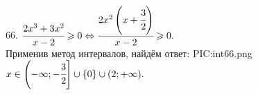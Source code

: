 66. $\cfrac{2x^3+3x^2}{x-2}\geqslant0\Leftrightarrow\cfrac{2x^2\left(x+\cfrac{3}{2}\right)}{x-2}\geqslant0.$\\ Применив метод интервалов, найдём ответ:
{{PIC:int66.png}}
$x\in\left(-\infty;-\cfrac{3}{2}\right]\cup\{0\}\cup(2;+\infty).$\\
